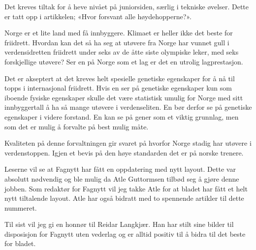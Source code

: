 Det kreves tiltak for å heve nivået på juniorsiden, særlig i tekniske øvelser. Dette er tatt opp i artikkelen; «Hvor forsvant alle høydehopperne?».

Norge er et lite land med få innbyggere. Klimaet er heller ikke det beste for friidrett. Hvordan kan det så ha seg at utøvere fra Norge har vunnet gull i verdensidretten friidrett under seks av de åtte siste olympiske leker, med seks forskjellige utøvere? Ser en på Norge som et lag er det en utrolig lagprestasjon.

Det er akseptert at det kreves helt spesielle genetiske egenskaper for å nå til topps i internasjonal friidrett. Hvis en ser på genetiske egenskaper kun som iboende fysiske egenskaper skulle det være statistisk umulig for Norge med sitt innbyggertall å ha så mange utøvere i verdenseliten. En bør derfor se på genetiske egenskaper i videre forstand. En kan se på gener som et viktig grunnlag, men som det er mulig å forvalte på best mulig måte.

Kvaliteten på denne forvaltningen gir svaret på hvorfor Norge stadig har utøvere i verdenstoppen. Igjen et bevis på den høye standarden det er på norske trenere.

Leserne vil se at Fagnytt har fått en oppdatering med nytt layout. Dette var absolutt nødvendig og ble mulig da Atle Guttormsen tilbød seg å gjøre denne jobben. Som redaktør for Fagnytt vil jeg takke Atle for at bladet har fått et helt nytt tiltalende layout. Atle har også bidratt med to spennende artikler til dette nummeret.

Til sist vil jeg gi en honnør til Reidar Langkjær. Han har stilt sine bilder til disposisjon for Fagnytt uten vederlag og er alltid positiv til å bidra til det beste for bladet. \sluttmerke
